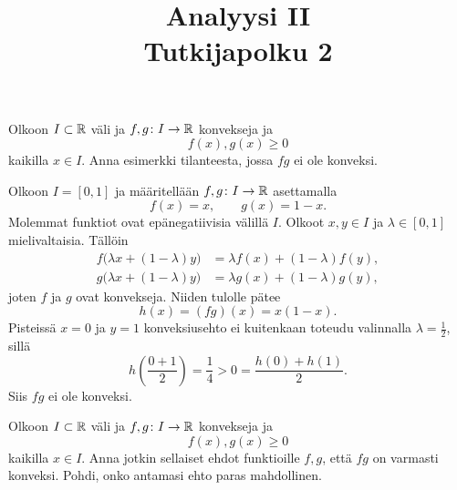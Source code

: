 \documentclass[11pt,a4paper]{amsart}
\title{Analyysi II\\Tutkijapolku 2}
\author{}
\date{}
\begin{document}

\begin{exercise}
  Olkoon \(I \subset \mathbb{R}\) väli ja \(f, g \colon I \to \mathbb{R}\) konvekseja ja
  \[
    f(x), g(x) \geq 0
  \]
  kaikilla \(x \in I\). Anna esimerkki tilanteesta, jossa \(fg\) ei
  ole konveksi.
\end{exercise}

\begin{solution}
  Olkoon \(I = [0, 1]\) ja määritellään \(f, g \colon I \to \mathbb{R}\) asettamalla
  \[
    f(x) = x, \qquad g(x) = 1 - x.
  \]
  Molemmat funktiot ovat epänegatiivisia välillä \(I\).
  Olkoot \(x, y \in I\) ja \(\lambda \in [0, 1]\) mielivaltaisia. Tällöin
  \[
    \begin{aligned}
      f\bigl(\lambda x + (1 - \lambda)y\bigr)
      &= \lambda f(x) + (1 - \lambda)f(y), \\
      g\bigl(\lambda x + (1 - \lambda)y\bigr)
      &= \lambda g(x) + (1 - \lambda)g(y),
    \end{aligned}
  \]
  joten \(f\) ja \(g\) ovat konvekseja. Niiden tulolle pätee
  \[
    h(x) = (fg)(x) = x(1 - x).
  \]
  Pisteissä \(x = 0\) ja \(y = 1\) konveksiusehto ei kuitenkaan toteudu
  valinnalla \(\lambda = \tfrac{1}{2}\), sillä
  \[
    h\!\left(\frac{0 + 1}{2}\right)
    = \frac{1}{4}
    > 0
    = \frac{h(0) + h(1)}{2}.
  \]
  Siis \(fg\) ei ole konveksi.
\end{solution}

\begin{exercise}
  Olkoon \(I \subset \mathbb{R}\) väli ja \(f, g \colon I \to \mathbb{R}\) konvekseja ja
  \[
    f(x), g(x) \geq 0
  \]
  kaikilla \(x \in I\). Anna jotkin sellaiset ehdot funktioille \(f, g\),
  että \(fg\) on varmasti konveksi. Pohdi, onko antamasi ehto paras
  mahdollinen.
\end{exercise}
\end{document}
